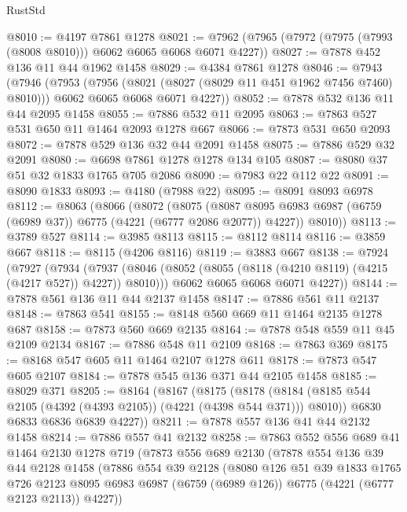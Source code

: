 \begin{lexlean}{RustStd}
\begin{coremodule}
@8010 := @4197 @7861 @1278
@8021 := @7962 (@7965 (@7972 (@7975 (@7993 (@8008 @8010))) @6062 @6065 @6068 @6071 @4227))
@8027 := @7878 @452 @136 @11 @44 @1962 @1458
@8029 := @4384 @7861 @1278
@8046 := @7943
    (@7946
      (@7953
        (@7956 (@8021 (@8027 (@8029 @11 @451 @1962 @7456 @7460) @8010)))
        @6062
        @6065
        @6068
        @6071
        @4227))
@8052 := @7878 @532 @136 @11 @44 @2095 @1458
@8055 := @7886 @532 @11 @2095
@8063 := @7863 @527 @531 @650 @11 @1464 @2093 @1278 @667
@8066 := @7873 @531 @650 @2093
@8072 := @7878 @529 @136 @32 @44 @2091 @1458
@8075 := @7886 @529 @32 @2091
@8080 := @6698 @7861 @1278 @1278 @134 @105
@8087 := @8080 @37 @51 @32 @1833 @1765 @705 @2086
@8090 := @7983 @22 @112 @22
@8091 := @8090 @1833
@8093 := @4180 (@7988 @22)
@8095 := @8091 @8093 @6978
@8112 := @8063
    (@8066
      (@8072
        (@8075
          (@8087 @8095 @6983 @6987 (@6759 (@6989 @37)) @6775 (@4221 (@6777 @2086 @2077)) @4227))
        @8010))
@8113 := @3789 @527
@8114 := @3985 @8113
@8115 := @8112 @8114
@8116 := @3859 @667
@8118 := @8115 (@4206 @8116)
@8119 := @3883 @667
@8138 := @7924
    (@7927
      (@7934
        (@7937 (@8046 (@8052 (@8055 (@8118 (@4210 @8119) (@4215 (@4217 @527)) @4227)) @8010)))
        @6062
        @6065
        @6068
        @6071
        @4227))
@8144 := @7878 @561 @136 @11 @44 @2137 @1458
@8147 := @7886 @561 @11 @2137
@8148 := @7863 @541
@8155 := @8148 @560 @669 @11 @1464 @2135 @1278 @687
@8158 := @7873 @560 @669 @2135
@8164 := @7878 @548 @559 @11 @45 @2109 @2134
@8167 := @7886 @548 @11 @2109
@8168 := @7863 @369
@8175 := @8168 @547 @605 @11 @1464 @2107 @1278 @611
@8178 := @7873 @547 @605 @2107
@8184 := @7878 @545 @136 @371 @44 @2105 @1458
@8185 := @8029 @371
@8205 := @8164
    (@8167
      (@8175
        (@8178 (@8184 (@8185 @544 @2105 (@4392 (@4393 @2105)) (@4221 (@4398 @544 @371))) @8010))
        @6830
        @6833
        @6836
        @6839
        @4227))
@8211 := @7878 @557 @136 @41 @44 @2132 @1458
@8214 := @7886 @557 @41 @2132
@8258 := @7863
    @552
    @556
    @689
    @41
    @1464
    @2130
    @1278
    @719
    (@7873
      @556
      @689
      @2130
      (@7878
        @554
        @136
        @39
        @44
        @2128
        @1458
        (@7886
          @554
          @39
          @2128
          (@8080
            @126
            @51
            @39
            @1833
            @1765
            @726
            @2123
            @8095
            @6983
            @6987
            (@6759 (@6989 @126))
            @6775
            (@4221 (@6777 @2123 @2113))
            @4227))

\end{coremodule}
\end{lexlean}

